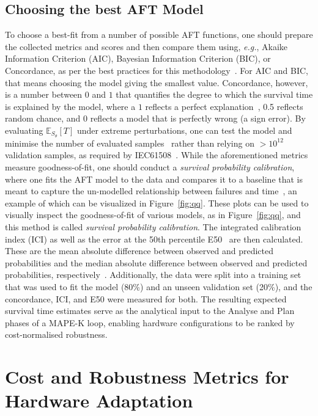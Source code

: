 \documentclass[conference]{IEEEtran}%
\begin{document}
\subsection{Choosing the best AFT Model}
\label{best-fit}
To choose a best-fit from a number of possible AFT functions, one should prepare the collected metrics and scores and then compare them using, \textit{e.g.}, Akaike Information Criterion (AIC), Bayesian Information Criterion (BIC), or Concordance, as per the best practices for this methodology~\cite{aft_models,kleinbaum1996survival}.
For AIC and BIC, that means choosing the model giving the smallest value. 
Concordance, however, is a number between $0$ and $1$ that quantifies the degree to which the survival time is explained by the model, where a $1$ reflects a perfect explanation~\cite{kleinbaum1996survival}, 0.5 reflects random chance, and 0 reflects a model that is perfectly wrong (a sign error). 
By evaluating $\mathbb{E}_{S_\theta}[T]$ under extreme perturbations, one can test the model and minimise the number of evaluated samples~\cite{aft_models,kleinbaum1996survival} rather than relying on $> 10^{12}$ validation samples, as required by IEC61508~\cite{IEC61508}.
While the aforementioned metrics measure goodness-of-fit, one should conduct a \textit{survival probability calibration}, where one fits the AFT model to the data and compares it to a baseline that is meant to capture the un-modelled relationship between failures and time~\cite{ici}, an example of which can be visualized in  Figure~\ref{fig:qq}. 
These plots can be used to visually inspect the goodness-of-fit of various models, as in Figure~\ref{fig:qq}, and this method is called \textit{survival probability calibration}.
The integrated calibration index (ICI) as well as the error at the 50th percentile E50~\cite{ici} are then calculated. These are the mean absolute difference between observed and predicted probabilities and the median absolute difference between observed and predicted probabilities, respectively~\cite{ici}.
Additionally, the data were split into a training set that was used to fit the model (80\%) and an unseen validation set (20\%), and the concordance, ICI, and E50 were measured for both.
The resulting expected survival time estimates serve as the analytical input to the Analyse and Plan phases of a MAPE-K loop, enabling hardware configurations to be ranked by cost-normalised robustness.






\section{Cost and Robustness Metrics for Hardware Adaptation}
\label{cost}
\end{document}

